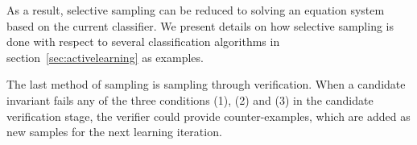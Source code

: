 As a result, selective sampling can be reduced to solving an equation system based on the current classifier. 
We present details on how selective sampling is done with respect to several classification algorithms in section~\ref{sec:activelearning} as examples. 


The last method of sampling is sampling through verification. 
When a candidate invariant fails any of the three conditions (1), (2) and (3) in the candidate verification stage,
the verifier could provide counter-examples, which are added as new samples for the next learning iteration. 

